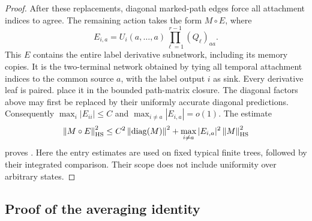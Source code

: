 \begin{proof}
After these replacements, diagonal marked-path edges force all
attachment indices to agree. The remaining action takes the form
$M\circ E$, where
\[
 E_{i,a}=U_i(a,\ldots,a)
                \prod_{\ell=1}^{r-1}(Q_\ell)_{aa}.
\]
This $E$ contains the entire label derivative subnetwork, including
its memory copies. It is the two-terminal network obtained by tying
all temporal attachment indices to the common source $a$, with the
label output $i$ as sink. Every derivative leaf is paired.
 place it
in the bounded path-matrix closure. The diagonal factors above may
first be replaced by their uniformly accurate diagonal predictions.
Consequently $\max_i|E_{ii}|\leq C$ and
$\max_{i\ne a}|E_{i,a}|=o(1)$. The estimate
\[
 \left\lVert M\circ E\right\rVert_{\mathrm{HS}}^2
 \leq C^2\left\lVert \operatorname{diag}(M)\right\rVert^2
       +\max_{i\ne a}|E_{i,a}|^2\left\lVert M\right\rVert_{\mathrm{HS}}^2
\]
proves . Here the entry estimates are used on fixed typical finite trees,
followed by their integrated comparison. Their scope does not include
uniformity over arbitrary states.
\end{proof}



\subsection{Proof of the averaging identity}
\label{subsec:hidden-averaging-proof}

